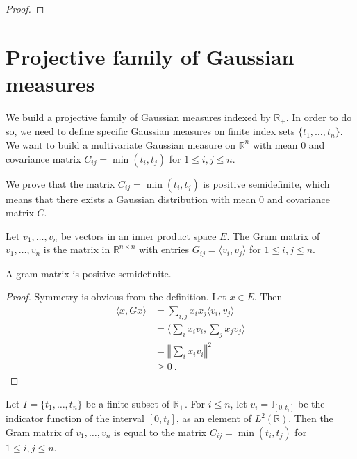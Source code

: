 \begin{proof}\leanok

\end{proof}


\section{Projective family of Gaussian measures}

We build a projective family of Gaussian measures indexed by $\mathbb{R}_+$.
In order to do so, we need to define specific Gaussian measures on finite index sets $\{t_1, \ldots, t_n\}$.
We want to build a multivariate Gaussian measure on $\mathbb{R}^n$ with mean $0$ and covariance matrix $C_{ij} = \min(t_i, t_j)$ for $1 \leq i,j \leq n$.

We prove that the matrix $C_{ij} = \min(t_i, t_j)$ is positive semidefinite, which means that there exists a Gaussian distribution with mean 0 and covariance matrix $C$.

\begin{definition}\label{def:gramMatrix}
  \mathlibok
Let $v_1, \ldots, v_n$ be vectors in an inner product space $E$.
The Gram matrix of $v_1, \ldots, v_n$ is the matrix in $\mathbb{R}^{n \times n}$ with entries $G_{ij} = \langle v_i, v_j \rangle$ for $1 \leq i,j \leq n$.
\end{definition}


\begin{lemma}\label{lem:posSemidef_gramMatrix}
  \mathlibok
A gram matrix is positive semidefinite.
\end{lemma}

\begin{proof}\leanok
Symmetry is obvious from the definition.
Let $x \in E$. Then
\begin{align*}
  \langle x, G x \rangle
  &= \sum_{i,j} x_i x_j \langle v_i, v_j \rangle
  \\
  &= \langle \sum_i x_i v_i, \sum_j x_j v_j \rangle
  \\
  &= \left\Vert \sum_i x_i v_i \right\Vert^2
  \\
  &\ge 0
  \: .
\end{align*}
\end{proof}


\begin{lemma}\label{lem:C_eq_gramMatrix}
  \leanok
Let $I = \{t_1, \ldots, t_n\}$ be a finite subset of $\mathbb{R}_+$.
For $i \le n$, let $v_i = \mathbb{I}_{[0, t_i]}$ be the indicator function of the interval $[0, t_i]$, as an element of $L^2(\mathbb{R})$.
Then the Gram matrix of $v_1, \ldots, v_n$ is equal to the matrix $C_{ij} = \min(t_i, t_j)$ for $1 \leq i,j \leq n$.
\end{lemma}


